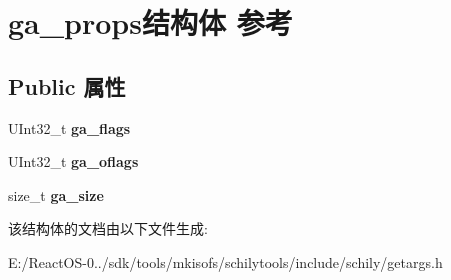 \hypertarget{structga__props}{}\section{ga\+\_\+props结构体 参考}
\label{structga__props}
\subsection*{Public 属性}
\begin{DoxyCompactItemize}
\item 
\mbox{\label{structga__props_a3d49c6966b1b594a49a5b5b2a549c1b9}} 
U\+Int32\+\_\+t {\bfseries ga\+\_\+flags}
\item 
\mbox{\label{structga__props_a27d128f530b6ab2ebd1a516f380fffdf}} 
U\+Int32\+\_\+t {\bfseries ga\+\_\+oflags}
\item 
\mbox{\label{structga__props_a8bb39ecc9a1b71f7ff1fe1a8b3417a60}} 
size\+\_\+t {\bfseries ga\+\_\+size}
\end{DoxyCompactItemize}


该结构体的文档由以下文件生成\+:\begin{DoxyCompactItemize}
\item 
E\+:/\+React\+O\+S-\/0../sdk/tools/mkisofs/schilytools/include/schily/getargs.\+h\end{DoxyCompactItemize}

